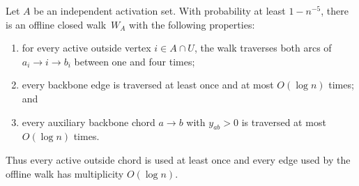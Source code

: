 \documentclass[12pt,a4paper,oneside]{report}
\begin{document}
\begin{theorem}
\label{thm:offline-backbone-walk}
Let $A$ be an independent activation set.  With probability at least
$1-n^{-5}$, there is an offline closed walk~$W_A$ with the following
properties:
\begin{enumerate}[label=(\roman*)]
    \item for every active outside vertex $i\in A\cap U$, the walk traverses
    both arcs of $a_i\to i\to b_i$ between one and four times;
    \item every backbone edge is traversed at least once and at most
    $O(\log n)$ times; and
    \item every auxiliary backbone chord $a\to b$ with $y_{ab}>0$ is traversed
    at most $O(\log n)$ times.
\end{enumerate}
Thus every active outside chord is used at least once and every edge used by
the offline walk has multiplicity $O(\log n)$.
\end{theorem}
\end{document}
